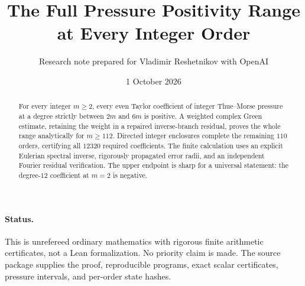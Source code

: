 \documentclass[11pt,a4paper]{article}
\title{The Full Pressure Positivity Range at Every Integer Order}
\author{Research note prepared for Vladimir Reshetnikov with OpenAI}
\date{1 October 2026}
\theoremstyle{remark}\newtheorem*{ednote}{Editorial note (ProveIt, 2026-10-01)}
\begin{document}
\maketitle
\begin{abstract}
For every integer $m\ge2$, every even Taylor coefficient of integer Thue--Morse pressure at a degree strictly between $2m$ and $6m$ is positive. A weighted complex Green estimate, retaining the weight in a repaired inverse-branch residual, proves the whole range analytically for $m\ge112$. Directed integer enclosures complete the remaining $110$ orders, certifying all $12320$ required coefficients. The finite calculation uses an explicit Eulerian spectral inverse, rigorously propagated error radii, and an independent Fourier residual verification. The upper endpoint is sharp for a universal statement: the degree-$12$ coefficient at $m=2$ is negative.
\end{abstract}
\paragraph{Status.} This is unrefereed ordinary mathematics with rigorous finite arithmetic certificates, not a Lean formalization. No priority claim is made. The source package supplies the proof, reproducible programs, exact scalar certificates, pressure intervals, and per-order state hashes.
\end{document}
